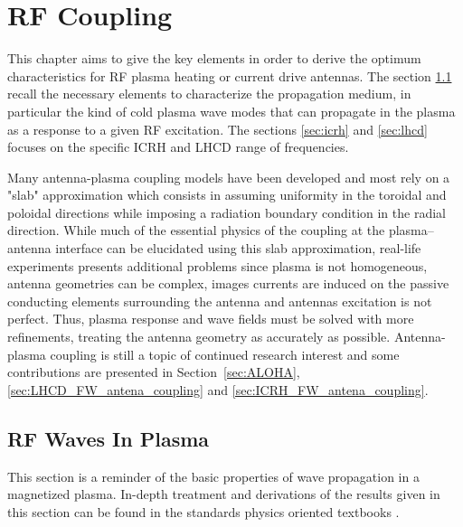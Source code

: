 \setchapterpreamble[u]{\margintoc}
\chapter{RF Coupling}
\label{chap:rf_coupling}


This chapter aims to give the key elements in order to derive the optimum characteristics for RF plasma heating or current drive antennas. The section \ref{sec:waves-in-plasma} recall the necessary elements to characterize the propagation medium, in particular the kind of cold plasma wave modes that can propagate in the plasma as a response to a given RF excitation. The sections \ref{sec:icrh} and \ref{sec:lhcd} focuses on the specific ICRH and LHCD range of frequencies. 

Many antenna-plasma coupling models have been developed and most rely on a "slab" approximation which consists in assuming uniformity in the toroidal and poloidal directions while imposing a radiation boundary condition in the radial direction. While much of the essential physics of the coupling at the plasma–antenna interface can be elucidated using this slab approximation, real-life experiments presents additional problems since plasma is not homogeneous, antenna geometries can be complex, images currents are induced on the passive conducting elements surrounding the antenna and antennas excitation is not perfect. Thus, plasma response and wave fields must be solved with more refinements, treating the antenna geometry as accurately as possible. Antenna-plasma coupling is still a topic of continued research interest and some contributions are presented in Section~\ref{sec:ALOHA}, \ref{sec:LHCD_FW_antena_coupling} and \ref{sec:ICRH_FW_antena_coupling}.


\section{RF Waves In Plasma}\label{sec:waves-in-plasma}
This section is a reminder of the basic properties of wave propagation in a magnetized plasma. In-depth treatment and derivations of the results given in this section can be found in the standards physics oriented textbooks . 

